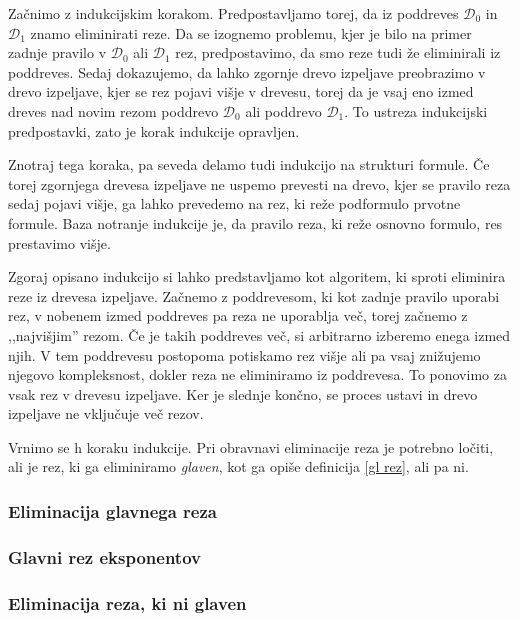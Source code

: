 Začnimo z indukcijskim korakom. Predpostavljamo torej, da iz poddreves $\mathcal{D}_0$ in $\mathcal{D}_1$ znamo eliminirati reze. Da se izognemo problemu, kjer je bilo na primer zadnje pravilo v $\mathcal{D}_0$ ali $\mathcal{D}_1$ rez, predpostavimo, da smo reze tudi že eliminirali iz poddreves. Sedaj dokazujemo, da lahko zgornje drevo izpeljave preobrazimo v drevo izpeljave, kjer se rez pojavi višje v drevesu, torej da je vsaj eno izmed dreves nad novim rezom poddrevo $\mathcal{D}_0$ ali poddrevo $\mathcal{D}_1$. To ustreza indukcijski predpostavki, zato je korak indukcije opravljen.

Znotraj tega koraka, pa seveda delamo tudi indukcijo na strukturi formule. Če torej zgornjega drevesa izpeljave ne uspemo prevesti na drevo, kjer se pravilo reza sedaj pojavi višje, ga lahko prevedemo na rez, ki reže podformulo prvotne formule. Baza notranje indukcije je, da pravilo reza, ki reže osnovno formulo, res prestavimo višje.

\begin{opomba}
    Zgoraj opisano indukcijo si lahko predstavljamo kot algoritem, ki sproti eliminira reze iz drevesa izpeljave. Začnemo z poddrevesom, ki kot zadnje pravilo uporabi rez, v nobenem izmed poddreves pa reza ne uporablja več, torej začnemo z ,,najvišjim'' rezom. Če je takih poddreves več, si arbitrarno izberemo enega izmed njih. V tem poddrevesu postopoma potiskamo rez višje ali pa vsaj znižujemo njegovo kompleksnost, dokler reza ne eliminiramo iz poddrevesa. To ponovimo za vsak rez v drevesu izpeljave. Ker je slednje končno, se proces ustavi in drevo izpeljave ne vključuje več rezov.
\end{opomba}

Vrnimo se h koraku indukcije. Pri obravnavi eliminacije reza je potrebno ločiti, ali je rez, ki ga eliminiramo \emph{glaven}, kot ga opiše definicija \ref{gl rez}, ali pa ni.

\subsubsection{Eliminacija glavnega reza} \label{gl rez vezniki}


\subsubsection{Glavni rez eksponentov}


\subsubsection{Eliminacija reza, ki ni glaven}


